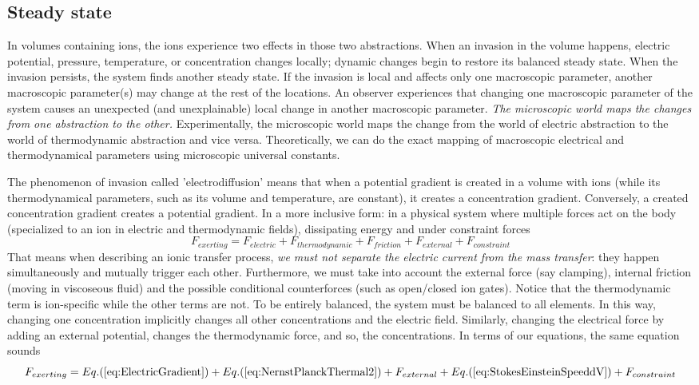 \subsection{Steady state\label{sec:Physics-SteadyState}}

In volumes containing ions, the ions experience two effects in those two abstractions. When an
invasion in the volume happens, electric potential, pressure, temperature,
or concentration changes locally; dynamic changes begin to restore
its balanced steady state. When the invasion persists, the system
finds another steady state. If the invasion is local and affects only
one macroscopic parameter, another macroscopic parameter(s) may change
at the rest of the locations. An observer experiences that changing
one macroscopic parameter of the system causes an unexpected (and
unexplainable) local change in another macroscopic parameter. \textit{The
microscopic world maps the changes from one abstraction to the other.}
Experimentally, the microscopic world maps the change from the world
of electric abstraction to the world of thermodynamic abstraction
and vice versa. Theoretically, we can do the exact mapping of macroscopic
electrical and thermodynamical parameters using microscopic universal
constants.


The phenomenon of invasion called 'electrodiffusion' means that when
a potential gradient is created in a volume with ions (while its thermodynamical
parameters, such as its volume and temperature, are constant), it
creates a concentration gradient. Conversely, a created concentration
gradient creates a potential gradient.
In a more inclusive form: in a physical system where multiple forces act on the body
(specialized to an ion in electric and thermodynamic fields),
dissipating energy and under constraint forces 
\begin{equation}
	F_{exerting} = F_{electric} + F_{thermodynamic} + F_{friction}   + F_{external} + F_{constraint}
	\label{eq:IonicForces0}
\end{equation}
\noindent
That means when describing an ionic transfer process, \textit{we must not separate the electric current from the mass transfer}: they happen simultaneously and mutually trigger each other. Furthermore,
we must take into account the external force (say clamping), internal friction (moving in viscoseous fluid) and the possible conditional counterforces (such as open/closed ion gates).
 Notice that the thermodynamic term is ion-specific while the other terms are not. To be entirely balanced, the system must be balanced to all elements. In this way, changing one concentration implicitly changes all other concentrations and the electric field.
 Similarly, changing the electrical force by adding an external
 potential, changes the thermodynamic force, and so, the concentrations.
\iflatexml
\else
In terms of our equations, the same equation sounds
\begin{equation}
	F_{exerting} = Eq.(\ref{eq:ElectricGradient}) + Eq.(\ref{eq:NernstPlanckThermal2}) + F_{external} + Eq.(\ref{eq:StokesEinsteinSpeeddV})  + F_{constraint}
	\label{eq:IonicForces}
\end{equation}
\fi


